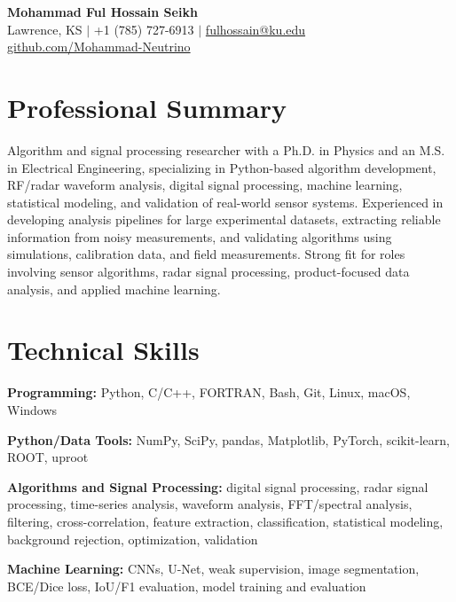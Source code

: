 \documentclass[10pt,letterpaper]{article}
\begin{document}
\begin{center}
    {\LARGE \textbf{Mohammad Ful Hossain Seikh}}\\
    Lawrence, KS $|$ +1 (785) 727-6913 $|$ 
    \href{mailto:fulhossain@ku.edu}{fulhossain@ku.edu}\\
    \href{https://github.com/Mohammad-Neutrino}{github.com/Mohammad-Neutrino} 
\end{center}

\section*{Professional Summary}

Algorithm and signal processing researcher with a Ph.D. in Physics and an M.S. in Electrical Engineering, specializing in Python-based algorithm development, RF/radar waveform analysis, digital signal processing, machine learning, statistical modeling, and validation of real-world sensor systems. Experienced in developing analysis pipelines for large experimental datasets, extracting reliable information from noisy measurements, and validating algorithms using simulations, calibration data, and field measurements. Strong fit for roles involving sensor algorithms, radar signal processing, product-focused data analysis, and applied machine learning.

\section*{Technical Skills}

\textbf{Programming:} Python, C/C++, FORTRAN, Bash, Git, Linux, macOS, Windows

\textbf{Python/Data Tools:} NumPy, SciPy, pandas, Matplotlib, PyTorch, scikit-learn, ROOT, uproot

\textbf{Algorithms and Signal Processing:} digital signal processing, radar signal processing, time-series analysis, waveform analysis, FFT/spectral analysis, filtering, cross-correlation, feature extraction, classification, statistical modeling, background rejection, optimization, validation

\textbf{Machine Learning:} CNNs, U-Net, weak supervision, image segmentation, BCE/Dice loss, IoU/F1 evaluation, model training and evaluation
\end{document}
